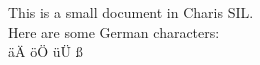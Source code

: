 \documentclass{article}
\begin{document}
This is a small document in Charis SIL.
\\
Here are some German characters:
\\
äÄ öÖ üÜ ß
\end{document}
